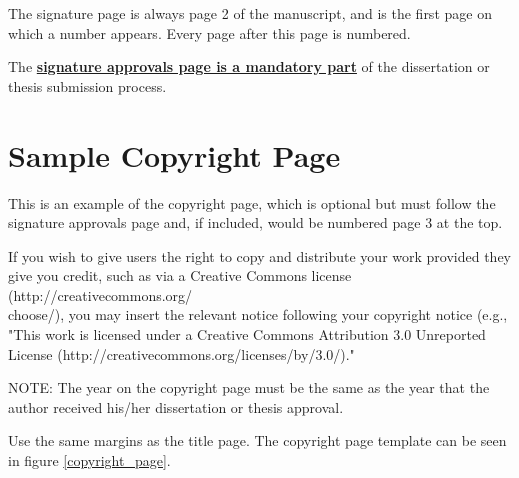 The signature page is always page 2 of the manuscript, and is the first page on which a number appears. Every page after this page is numbered.

The \underline{\textbf{signature approvals page is a mandatory part}} of the dissertation or thesis submission process.

\section{Sample Copyright Page}

This is an example of the copyright page, which is optional but must follow the signature approvals page and, if included, would be numbered page 3 at the top.  

If you wish to give users the right to copy and distribute your work provided they give you credit, such as via a Creative Commons license (http://creativecommons.org/\\choose/), you may insert the relevant notice following your copyright notice (e.g., "This work is licensed under a Creative Commons Attribution 3.0 Unreported License (http://creativecommons.org/licenses/by/3.0/)."

NOTE: The year on the copyright page must be the same as the year that the author received his/her dissertation or thesis approval.

Use the same margins as the title page. The copyright page template can be seen in figure \ref{copyright_page}.

